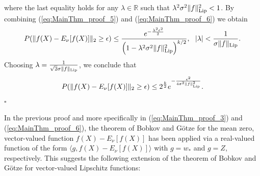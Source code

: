 \documentclass[twoside,11pt]{article}
\begin{document}
where the last equality holds for any  $\lambda\in \mathbb{R}$ such that $\lambda^2 \sigma^2 \|f\|_{\rm Lip}^2<1$. By combining (\ref{eq:MainThm_proof_5}) and (\ref{eq:MainThm_proof_6}) we obtain 
\begin{align}\label{eq:MainThm_proof_7}
P(\|f(X)-E_{\nu}[f(X)]\|_2\geq \epsilon)\leq \frac{e^{-\frac{\lambda^2 \epsilon^2}{2}}}{\left(1-\lambda^2 \sigma^2 \|f\|_{\rm Lip}^2\right)^{k/2}}, \ \ |\lambda|<\frac{1}{\sigma \|f\|_{\rm Lip}}. 
\end{align}
Choosing $\lambda=\frac{1}{\sqrt{2}\sigma \|f\|_{\rm Lip}}$, we conclude that 
\begin{align}
P(\|f(X)-E_{\nu}[f(X)]\|_2\geq \epsilon)\leq 2^{\frac{k}{2}}e^{-\frac{\epsilon^2}{4\sigma^2 \|f\|_{\rm Lip}^2}}.
\end{align}
 \hfill $\square$
 
 In the previous proof and more specifically in (\ref{eq:MainThm_proof_3}) and (\ref{eq:MainThm_proof_6}), the theorem of Bobkov and G\"{o}tze for the mean zero, vector-valued function $f(X)-E_{\nu}[f(X)]$ has been applied via a real-valued function of the form $\langle g,f(X)-E_{\nu}[f(X)]\rangle$ with $g=w_{*}$ and $g=Z$, respectively. This suggests the following extension of the theorem of Bobkov and G\"{o}tze for vector-valued Lipschitz functions: 
 
\end{document}
